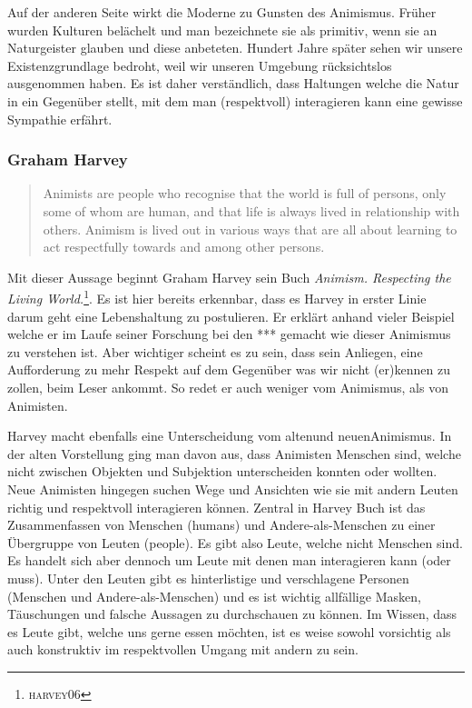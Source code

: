 Auf der anderen Seite wirkt die Moderne zu Gunsten des Animismus. Früher wurden Kulturen belächelt und man bezeichnete sie als primitiv, wenn sie an Naturgeister glauben und diese anbeteten. Hundert Jahre später sehen wir unsere Existenzgrundlage bedroht, weil wir unseren Umgebung rücksichtslos ausgenommen haben. Es ist daher verständlich, dass Haltungen welche die Natur in ein Gegenüber stellt, mit dem man (respektvoll) interagieren kann eine gewisse Sympathie erfährt.

\subsubsection*{Graham Harvey}
\begin{quote}
	Animists are people who recognise that the world is full of persons, only some of whom are human, and that life is always lived in relationship with others. Animism is lived out in various ways that are all about learning to act respectfully towards and among other persons.\cite{harvey06}
\end{quote}

Mit dieser Aussage beginnt Graham Harvey sein Buch \emph{Animism. Respecting the Living World.}\footnote{\textsc{harvey06}}. Es ist hier bereits erkennbar, dass es Harvey in erster Linie darum geht eine Lebenshaltung zu postulieren. Er erklärt anhand vieler Beispiel welche er im Laufe seiner Forschung bei den *** gemacht wie dieser Animismus zu verstehen ist. Aber wichtiger scheint es zu sein, dass sein Anliegen, eine Aufforderung zu mehr Respekt auf dem Gegenüber was wir nicht (er)kennen zu zollen, beim Leser ankommt. So redet er auch weniger vom Animismus, als von Animisten.

Harvey macht ebenfalls eine Unterscheidung vom \glqq alten\grqq und \glqq neuen\grqq Animismus. In der alten Vorstellung ging man davon aus, dass Animisten Menschen sind, welche nicht zwischen Objekten und Subjektion unterscheiden konnten oder wollten. Neue Animisten hingegen suchen Wege und Ansichten wie sie mit andern Leuten richtig und respektvoll interagieren können. Zentral in Harvey Buch ist das Zusammenfassen von Menschen (humans) und Andere-als-Menschen zu einer Übergruppe von Leuten (people). Es gibt also Leute, welche nicht Menschen sind. Es handelt sich aber dennoch um Leute mit denen man interagieren kann (oder muss). Unter den Leuten gibt es hinterlistige und verschlagene Personen (Menschen und Andere-als-Menschen) und es ist wichtig allfällige Masken, Täuschungen und falsche Aussagen zu durchschauen zu können. Im Wissen, dass es Leute gibt, welche uns gerne essen möchten, ist es weise sowohl vorsichtig als auch konstruktiv im respektvollen Umgang mit andern zu sein.

